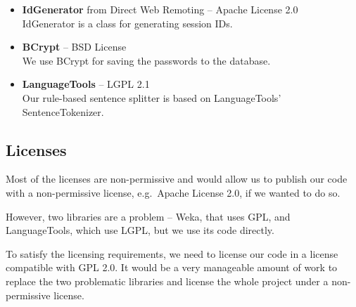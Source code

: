 \begin{itemize}
\item {\bf IdGenerator} from Direct Web Remoting -- Apache License 2.0\\
IdGenerator is a class for generating session IDs.

\item {\bf BCrypt} -- BSD License\\
We use BCrypt for saving the passwords to the database.

\item {\bf LanguageTools} -- LGPL 2.1\\
Our rule-based sentence splitter is based on LanguageTools' SentenceTokenizer.

\end{itemize}

\subsection*{Licenses}
Most of the licenses are non-permissive and would allow us to publish our code with a non-permissive license, e.g.\ Apache License 2.0, if we wanted to do so.

However, two libraries are a problem -- Weka, that uses GPL, and LanguageTools, which use LGPL, but we use its code directly.

To satisfy the licensing requirements, we need to license our code in a license compatible with GPL 2.0. It would be a very manageable amount of work to replace the two problematic libraries and license the whole project under a non-permissive license.